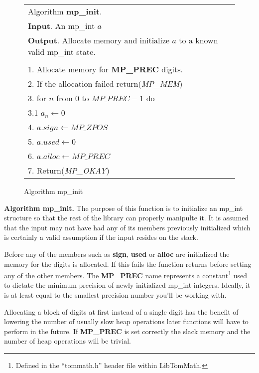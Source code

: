 \documentclass[b5paper]{book}
\begin{document}
\begin{figure}[here]
\begin{center}
\begin{tabular}{l}
\hline Algorithm \textbf{mp\_init}. \\
\textbf{Input}.   An mp\_int $a$ \\
\textbf{Output}.  Allocate memory and initialize $a$ to a known valid mp\_int state.  \\
\hline \\
1.  Allocate memory for \textbf{MP\_PREC} digits. \\
2.  If the allocation failed return(\textit{MP\_MEM}) \\
3.  for $n$ from $0$ to $MP\_PREC - 1$ do  \\
\hspace{3mm}3.1  $a_n \leftarrow 0$\\
4.  $a.sign \leftarrow MP\_ZPOS$\\
5.  $a.used \leftarrow 0$\\
6.  $a.alloc \leftarrow MP\_PREC$\\
7.  Return(\textit{MP\_OKAY})\\
\hline
\end{tabular}
\end{center}
\caption{Algorithm mp\_init}
\end{figure}

\textbf{Algorithm mp\_init.}
The purpose of this function is to initialize an mp\_int structure so that the rest of the library can properly
manipulte it.  It is assumed that the input may not have had any of its members previously initialized which is certainly
a valid assumption if the input resides on the stack.  

Before any of the members such as \textbf{sign}, \textbf{used} or \textbf{alloc} are initialized the memory for
the digits is allocated.  If this fails the function returns before setting any of the other members.  The \textbf{MP\_PREC} 
name represents a constant\footnote{Defined in the ``tommath.h'' header file within LibTomMath.} 
used to dictate the minimum precision of newly initialized mp\_int integers.  Ideally, it is at least equal to the smallest
precision number you'll be working with.

Allocating a block of digits at first instead of a single digit has the benefit of lowering the number of usually slow
heap operations later functions will have to perform in the future.  If \textbf{MP\_PREC} is set correctly the slack 
memory and the number of heap operations will be trivial.
\end{document}
